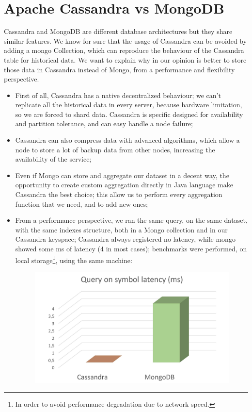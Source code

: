 \section{Apache Cassandra vs MongoDB}
Cassandra and MongoDB are different database architectures but they share
similar features. We know for sure that the usage of Cassandra can be avoided by
adding a mongo Collection, which can reproduce the behaviour of the Cassandra
table for historical data. We want to explain why in our opinion is better to
store those data in Cassandra instead of Mongo, from a performance and
flexibility perspective.
\begin{itemize}
    \item First of all, Cassandra has a native decentralized behaviour; we can't
    replicate all the historical data in every server, because hardware
    limitation, so we are forced to shard data. Cassandra is specific designed
    for availability and partition tolerance, and can easy handle a node failure;
    \item Cassandra can also compress data with advanced algorithms, which allow
    a node to store a lot of backup data from other nodes, increasing the
    availability of the service;
    \item Even if Mongo can store and aggregate our dataset in a decent way, the
    opportunity to create custom aggregation directly in Java language make
    Cassandra the best choice; this allow us to perform every aggregation
    function that we need, and to add new ones;
    \item From a performance perspective, we ran the same query, on the same
    dataset, with the same indexes structure, both in a Mongo collection and in
    our Cassandra keyspace; Cassandra always registered no latency, while mongo
    showed some ms of latency (4 in most cases); benchmarks were performed, on
    local storage\footnote{In order to avoid performance degradation due to
    network speed.}, using the same machine:
    \begin{figure}[H]
        \begin{center}
            \includegraphics[scale=0.8]{img/cassandra_vs_mongoDB.png}
        \end{center}
    \end{figure}
\end{itemize}
